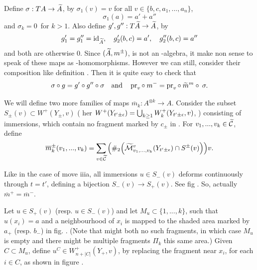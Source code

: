 Define $\sigma : TA \to \widetilde{A}$, by $\sigma_1(v) = v$ for all 
$v\in \{ b,c,a_1,...,a_n \}$, \[  \sigma_1(a) = a' + a'' \] and $\sigma_k = 0$ for
$k>1$. Also define $g', g'': T\widetilde{A} \to \widetilde{A}$, by 
\[ g'_1 = g''_1 = \operatorname{id}_{\widetilde{A}}, \quad g'_2(b,c) = a', \quad g''_2(b,c) = a''  \]
and both are otherwise 0. Since $(\widetilde{A},m^\pm)$, is not an \Ainf-algebra,
it make non sense to speak of these maps as \Ainf-homomorphisms. However we
can still, consider their composition like definition .
Then it is quite easy to check that 
\begin{equation}
\label{eq:sigma_g}
\sigma \circ g = g' \circ g'' \circ \sigma 
\quad\text{and}\quad
\operatorname{pr}_v \circ\: m^- = \operatorname{pr}_v \circ\: \widetilde{m}^m \circ\: \sigma. 
\end{equation}

\newcommand{\bm}{\overline{m}}

We will define two  more families of maps $\bm_k: A^{\otimes k} \to A$. 
Consider the subset $S_\pm(v) \subset W^+(Y_\pm,v)$ 
( her $W^+(Y_{t'\pm\epsilon}) = \bigcup_{k\ge 1} W^+_k(Y_{t'\pm\epsilon},v)$, ) consisting of immersions, which contain no fragment 
marked by $c_\pm$ in . For $v_1,...,v_k \in \widetilde{\mathcal{C}}$, define 
%
\begin{equation}
\bm^\pm_k(v_1,...,v_k) = \sum_{v\in \tC } \qty(\#_2\qty(
\tilde{\M}^v_{v_1,...,v_k}(Y_{t'\pm\epsilon}) \cap S^{\pm}(v) )) v. 
\end{equation}



Like in the case of move iiia, all immersions $u\in S_-(v)$ deforms
continuously through $t=t'$, defining a bijection $S_-(v) \to S_+(v)$. See fig
. So, actually $\bm^+ = \bm^-$.


Let $u \in S_+(v)$ (resp. $u\in S_-(v)$) and let $M_u \subset \{1,...,k\}$, such that $u(x_i) = a$
and a neighbourhood of $x_i$ is mapped to the shaded
area marked by $a_+$ (resp. $b_-$) in fig. . (Note that might both no such
fragments, in which case $M_u$ is empty and there might be multiple 
fragments $\Pi_k$ this same area.)
Given $C \subset M_u$, define $u^C \in W^+_{n+|C|}(Y_+, v)$, by
replacing the fragment near $x_i$, for each $i \in C$, as shown in figure
. 

